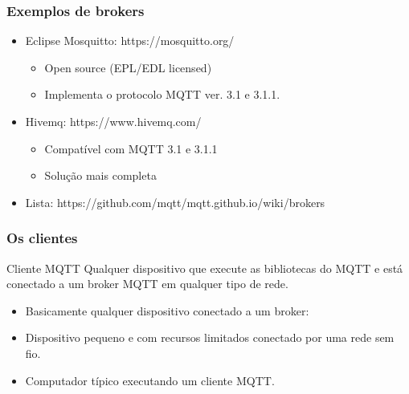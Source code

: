 \documentclass{beamer}
\begin{document}


\begin{frame}
\frametitle{Exemplos de brokers}
\begin{itemize}

\item Eclipse Mosquitto: https://mosquitto.org/
	\begin{itemize}
	\item Open source (EPL/EDL licensed) 
	\item Implementa o protocolo MQTT ver. 3.1 e 3.1.1. 
	\end{itemize}
    
\item Hivemq: https://www.hivemq.com/
	\begin{itemize}
	\item Compat\'{i}vel com MQTT 3.1 e 3.1.1 
	\item Solu\c{c}\~ao mais completa
	\end{itemize}
    
\item Lista: https://github.com/mqtt/mqtt.github.io/wiki/brokers

\end{itemize}
\end{frame}




\begin{frame}
\frametitle{Os clientes}

\begin{block}{Cliente MQTT}
Qualquer dispositivo que execute as bibliotecas do MQTT e est\'{a} conectado a um broker MQTT em qualquer tipo de rede.
\end{block}
\begin{itemize}
\item Basicamente qualquer dispositivo conectado a um broker:

\item Dispositivo pequeno e com recursos limitados conectado por uma rede sem fio. 
\item Computador t\'{i}pico executando um cliente MQTT.

\end{itemize}

\end{frame}

\end{document}
